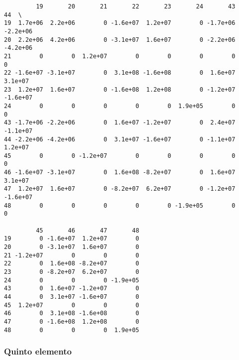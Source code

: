\documentclass{article}
\begin{document}
    
    \begin{verbatim}
         19       20       21       22       23       24       43       44  \
19  1.7e+06  2.2e+06        0 -1.6e+07  1.2e+07        0 -1.7e+06 -2.2e+06   
20  2.2e+06  4.2e+06        0 -3.1e+07  1.6e+07        0 -2.2e+06 -4.2e+06   
21        0        0  1.2e+07        0        0        0        0        0   
22 -1.6e+07 -3.1e+07        0  3.1e+08 -1.6e+08        0  1.6e+07  3.1e+07   
23  1.2e+07  1.6e+07        0 -1.6e+08  1.2e+08        0 -1.2e+07 -1.6e+07   
24        0        0        0        0        0  1.9e+05        0        0   
43 -1.7e+06 -2.2e+06        0  1.6e+07 -1.2e+07        0  2.4e+07 -1.1e+07   
44 -2.2e+06 -4.2e+06        0  3.1e+07 -1.6e+07        0 -1.1e+07  1.2e+07   
45        0        0 -1.2e+07        0        0        0        0        0   
46 -1.6e+07 -3.1e+07        0  1.6e+08 -8.2e+07        0  1.6e+07  3.1e+07   
47  1.2e+07  1.6e+07        0 -8.2e+07  6.2e+07        0 -1.2e+07 -1.6e+07   
48        0        0        0        0        0 -1.9e+05        0        0   

         45       46       47       48  
19        0 -1.6e+07  1.2e+07        0  
20        0 -3.1e+07  1.6e+07        0  
21 -1.2e+07        0        0        0  
22        0  1.6e+08 -8.2e+07        0  
23        0 -8.2e+07  6.2e+07        0  
24        0        0        0 -1.9e+05  
43        0  1.6e+07 -1.2e+07        0  
44        0  3.1e+07 -1.6e+07        0  
45  1.2e+07        0        0        0  
46        0  3.1e+08 -1.6e+08        0  
47        0 -1.6e+08  1.2e+08        0  
48        0        0        0  1.9e+05  
    \end{verbatim}

    
    \subsubsection{Quinto elemento}\label{quinto-elemento}
\end{document}
